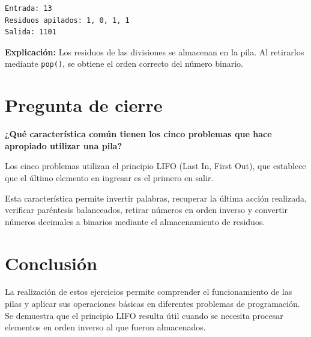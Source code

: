 \documentclass[12pt,a4paper]{article}
\begin{document}
\begin{verbatim}
Entrada: 13
Residuos apilados: 1, 0, 1, 1
Salida: 1101
\end{verbatim}

\textbf{Explicación:} Los residuos de las divisiones
se almacenan en la pila. Al retirarlos mediante
\texttt{pop()}, se obtiene el orden correcto del
número binario.
\href{\href{}{}}{}
\section*{Pregunta de cierre}

\textbf{¿Qué característica común tienen los cinco
problemas que hace apropiado utilizar una pila?}

Los cinco problemas utilizan el principio LIFO
(Last In, First Out), que establece que el último
elemento en ingresar es el primero en salir.

Esta característica permite invertir palabras,
recuperar la última acción realizada, verificar
paréntesis balanceados, retirar números en orden
inverso y convertir números decimales a binarios
mediante el almacenamiento de residuos.

\section*{Conclusión}

La realización de estos ejercicios permite comprender
el funcionamiento de las pilas y aplicar sus operaciones
básicas en diferentes problemas de programación.
Se demuestra que el principio LIFO resulta útil cuando
se necesita procesar elementos en orden inverso
al que fueron almacenados.
\end{document}
